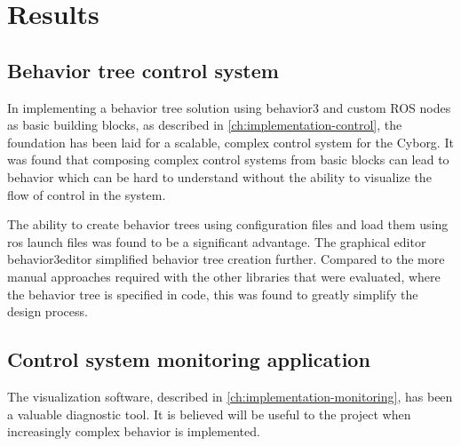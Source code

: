 \documentclass[\rootfolder/main.tex]{subfiles}
\begin{document}
\chapter{Results}
\label{ch:results} %



\section{Behavior tree control system}

In implementing a behavior tree solution using behavior3 and custom ROS nodes as basic building blocks, as described in \cref{ch:implementation-control}, the foundation has been laid for a scalable, complex control system for the Cyborg.
It was found that composing complex control systems from basic blocks can lead to behavior which can be hard to understand without the ability to visualize the flow of control in the system.

The ability to create behavior trees using configuration files and load them using \acrshort{ros} launch files was found to be a significant advantage.
The graphical editor behavior3editor simplified behavior tree creation further.
Compared to the more manual approaches required with the other libraries that were evaluated, where the behavior tree is specified in code, this was found to greatly simplify the design process.


\section{Control system monitoring application}

The visualization software, described in \cref{ch:implementation-monitoring}, has been a valuable diagnostic tool.
It is believed will be useful to the project when increasingly complex behavior is implemented.
\end{document}
